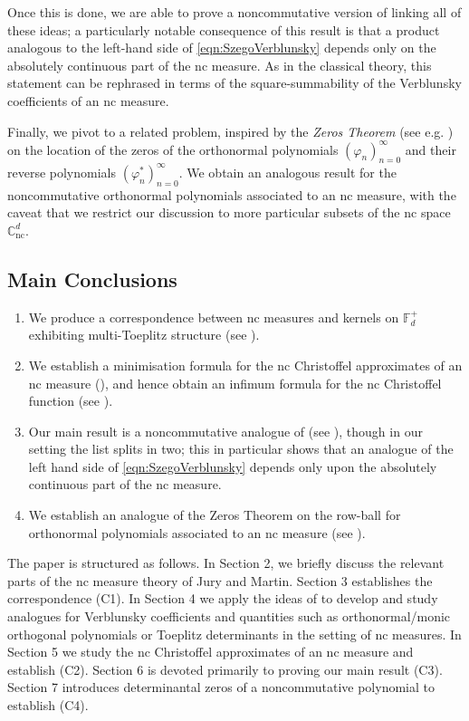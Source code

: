 \documentclass[11pt,reqno]{amsart}
\def\p{\varphi}
\def\CC{\mathbb{C}}
\def\FF{\mathbb{F}}
\def\nc{\mathrm{nc}}
\theoremstyle{definition}
\numberwithin{equation}{section}
\begin{document}
Once this is done, we are able to prove a noncommutative version of  linking all of these ideas; a particularly notable consequence of this result is that a product analogous to the left-hand side of \eqref{eqn:SzegoVerblunsky} depends only on the absolutely continuous part of the nc measure. As in the classical theory, this statement can be rephrased in terms of the square-summability of the Verblunsky coefficients of an nc measure.

Finally, we pivot to a related problem, inspired by the \emph{Zeros Theorem} (see e.g. \cite[Theorem 1.7.1]{Sim05}) on the location of the zeros of the orthonormal polynomials \((\p_n)_{n=0}^{\infty}\) and their reverse polynomials \((\p_n^*)_{n=0}^{\infty}\). We obtain an analogous result for the noncommutative orthonormal polynomials associated to an nc measure, with the caveat that we restrict our discussion to more particular subsets of the nc space \(\CC^d_\nc\).

\subsection{Main Conclusions}

\begin{enumerate}
    \item[(C1)] We produce a correspondence between nc measures and kernels on \(\FF_d^+\) exhibiting multi-Toeplitz structure (see ).
    \item[(C2)] We establish a minimisation formula for the nc Christoffel approximates of an nc measure (), and hence obtain an infimum formula for the nc Christoffel function (see ).
    \item[(C3)] Our main result is a noncommutative analogue of  (see ), though in our setting the list splits in two; this in particular shows that an analogue of the left hand side of \eqref{eqn:SzegoVerblunsky} depends only upon the absolutely continuous part of the nc measure.
    \item[(C4)] We establish an analogue of the Zeros Theorem on the row-ball for orthonormal polynomials associated to an nc measure (see ).
\end{enumerate}

The paper is structured as follows. In Section 2, we briefly discuss the relevant parts of the nc measure theory of Jury and Martin. Section 3 establishes the correspondence (C1). In Section 4 we apply the ideas of \cite{CJ02b} to develop and study analogues for Verblunsky coefficients and quantities such as orthonormal/monic orthogonal polynomials or Toeplitz determinants in the setting of nc measures. In Section 5 we study the nc Christoffel approximates of an nc measure and establish (C2). Section 6 is devoted primarily to proving our main result (C3). Section 7 introduces determinantal zeros of a noncommutative polynomial to establish (C4).
\end{document}
